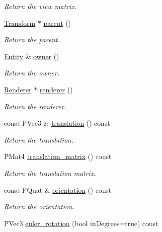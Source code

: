 \begin{DoxyCompactItemize}
\begin{DoxyCompactList}\small\item\em Return the view matrix. \end{DoxyCompactList}\item 
\mbox{\hyperlink{classprz_1_1_transform}{Transform}} $\ast$ \mbox{\hyperlink{classprz_1_1_transform_a9acc3ca9bcab25fba6ab51727c240432}{parent}} ()
\begin{DoxyCompactList}\small\item\em Return the parent. \end{DoxyCompactList}\item 
\mbox{\hyperlink{classprz_1_1_entity}{Entity}} \& \mbox{\hyperlink{classprz_1_1_transform_a16403133940713f900fcc5b66300a10b}{owner}} ()
\begin{DoxyCompactList}\small\item\em Return the owner. \end{DoxyCompactList}\item 
\mbox{\hyperlink{classprz_1_1_renderer}{Renderer}} $\ast$ \mbox{\hyperlink{classprz_1_1_transform_ad54f15b6454bb7b1df3fa529e41032db}{renderer}} ()
\begin{DoxyCompactList}\small\item\em Return the renderer. \end{DoxyCompactList}\item 
const P\+Vec3 \& \mbox{\hyperlink{classprz_1_1_transform_ab23448e27c3d383e9e494c1518058ee8}{translation}} () const
\begin{DoxyCompactList}\small\item\em Return the translation. \end{DoxyCompactList}\item 
P\+Mat4 \mbox{\hyperlink{classprz_1_1_transform_a987d7f508f84c41ce41d38c7d29ab1a2}{translation\+\_\+matrix}} () const
\begin{DoxyCompactList}\small\item\em Return the translation matrix. \end{DoxyCompactList}\item 
const P\+Quat \& \mbox{\hyperlink{classprz_1_1_transform_ab97343c6d88125e347369511b80e8dc0}{orientation}} () const
\begin{DoxyCompactList}\small\item\em Return the orientation. \end{DoxyCompactList}\item 
P\+Vec3 \mbox{\hyperlink{classprz_1_1_transform_a1bd0c0c85eb27c3dda501de30b950010}{euler\+\_\+rotation}} (bool in\+Degrees=true) const

\end{DoxyCompactItemize}
